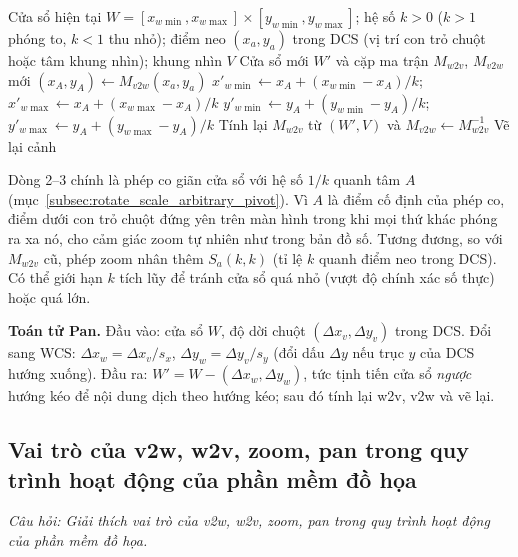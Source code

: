 \begin{algorithm}[H]
\caption{Toán tử \textsc{Zoom}}
\label{alg:w6_zoom}
\begin{algorithmic}[1]
\Require Cửa sổ hiện tại $W = [x_{w\min}, x_{w\max}] \times [y_{w\min}, y_{w\max}]$; hệ số $k > 0$ ($k > 1$ phóng to, $k < 1$ thu nhỏ); điểm neo $(x_a, y_a)$ trong DCS (vị trí con trỏ chuột hoặc tâm khung nhìn); khung nhìn $V$
\Ensure Cửa sổ mới $W'$ và cặp ma trận $M_{w2v}$, $M_{v2w}$ mới
\State $(x_A, y_A) \gets M_{v2w}(x_a, y_a)$ 
\State $x'_{w\min} \gets x_A + (x_{w\min} - x_A)/k$; \quad $x'_{w\max} \gets x_A + (x_{w\max} - x_A)/k$
\State $y'_{w\min} \gets y_A + (y_{w\min} - y_A)/k$; \quad $y'_{w\max} \gets y_A + (y_{w\max} - y_A)/k$
\State Tính lại $M_{w2v}$ từ $(W', V)$ và $M_{v2w} \gets M_{w2v}^{-1}$
\State Vẽ lại cảnh
\end{algorithmic}
\end{algorithm}
Dòng 2--3 chính là phép co giãn cửa sổ với hệ số $1/k$ quanh tâm $A$ (mục~\ref{subsec:rotate_scale_arbitrary_pivot}). Vì $A$ là điểm cố định của phép co, điểm dưới con trỏ chuột đứng yên trên màn hình trong khi mọi thứ khác phóng ra xa nó, cho cảm giác zoom tự nhiên như trong bản đồ số. Tương đương, so với $M_{w2v}$ cũ, phép zoom nhân thêm $S_{a}(k, k)$ (tỉ lệ $k$ quanh điểm neo trong DCS). Có thể giới hạn $k$ tích lũy để tránh cửa sổ quá nhỏ (vượt độ chính xác số thực) hoặc quá lớn.

\textbf{Toán tử Pan.} Đầu vào: cửa sổ $W$, độ dời chuột $(\Delta x_v, \Delta y_v)$ trong DCS. Đổi sang WCS: $\Delta x_w = \Delta x_v / s_x$, $\Delta y_w = \Delta y_v / s_y$ (đổi dấu $\Delta y$ nếu trục $y$ của DCS hướng xuống). Đầu ra: $W' = W - (\Delta x_w, \Delta y_w)$, tức tịnh tiến cửa sổ \emph{ngược} hướng kéo để nội dung dịch theo hướng kéo; sau đó tính lại w2v, v2w và vẽ lại.

\subsection{Vai trò của v2w, w2v, zoom, pan trong quy trình hoạt động của phần mềm đồ họa}
\label{subsec:w6_pipeline}

\textit{Câu hỏi: Giải thích vai trò của v2w, w2v, zoom, pan trong quy trình hoạt động của phần mềm đồ họa.}

